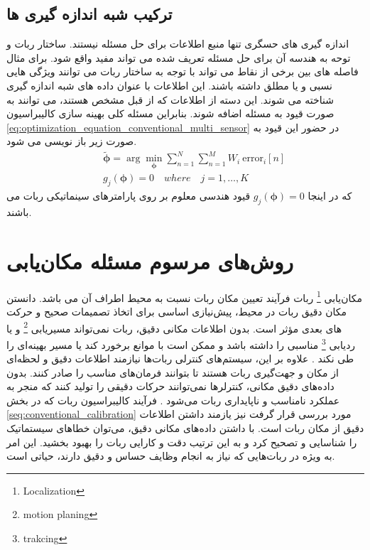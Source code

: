 \subsection{ترکیب شبه اندازه گیری ها}
اندازه گیری های حسگری تنها منبع اطلاعات برای حل مسئله نیستند. ساختار ربات و توحه به هندسه آن برای حل مسئله تعریف شده می تواند مفید واقع شود. برای مثال فاصله های بین برخی از نقاط می تواند با توجه به ساختار ربات می توانند ویژگی هایی نسبی و یا مطلق داشته باشند. این اطلاعات با عنوان داده های شبه اندازه گیری شناخته می شوند. این دسته از اطلاعات که از قبل مشخص هستند، می توانند به صورت قیود به مسئله اضافه شوند. بنابراین مسئله کلی بهینه سازی کالیبراسیون
\ref{eq:optimization_equation_conventional_multi_sensor}
در حضور این قیود به صورت زیر باز نویسی می شود. 
\begin{equation}
	\begin{aligned} \label{eq:optimization_equation_conventional_multi_sensor_measurement}
		&\tilde{\boldsymbol{\phi}} =  \arg\min_{\boldsymbol{\phi}} \sum_{n = 1 }^{N} \sum_{n = 1 }^{M} W_i~\text{error}_i[n] \\
		\quad &g_j(\boldsymbol{\phi}) = 0 \quad where \quad j = 1, \ldots, K
	\end{aligned}
\end{equation}
که در اینجا
$g_j(\boldsymbol{\phi}) = 0$ 
قیود هندسی معلوم بر روی پارامترهای سینماتیکی ربات می باشند.

\section{روش‌های مرسوم مسئله مکان‌یابی}
مکان‌یابی
\footnote{Localization}
 ربات فرآیند تعیین مکان ربات نسبت به محیط اطراف آن می باشد. دانستن مکان دقیق ربات در محیط، پیش‌نیازی اساسی برای اتخاذ تصمیمات صحیح و حرکت های بعدی مؤثر است. بدون اطلاعات مکانی دقیق، ربات نمی‌تواند مسیریابی
\footnote{motion planing}
  و یا ردیابی
\footnote{trakcing}
مناسبی را داشته باشد و ممکن است با موانع برخورد کند یا مسیر بهینه‌ای را طی نکند
\cite{ahmad2013cooperative}.
 علاوه بر این، سیستم‌های کنترلی ربات‌ها نیازمند اطلاعات دقیق و لحظه‌ای از مکان و جهت‌گیری ربات هستند تا بتوانند فرمان‌های مناسب را صادر کنند. بدون داده‌های دقیق مکانی، کنترلرها نمی‌توانند حرکات دقیقی را تولید کنند که منجر به عملکرد نامناسب و ناپایداری ربات می‌شود
\cite{guibas1997robot}.
فرآیند کالیبراسیون ربات که در بخش 
\ref{seq:conventional_calibration}
مورد بررسی قرار گرفت نیز یازمند داشتن اطلاعات دقیق از مکان ربات است. با داشتن داده‌های مکانی دقیق، می‌توان خطاهای سیستماتیک را شناسایی و تصحیح کرد و به این ترتیب دقت و کارایی ربات را بهبود بخشید. این امر به ویژه در ربات‌هایی که نیاز به انجام وظایف حساس و دقیق دارند، حیاتی است. 

